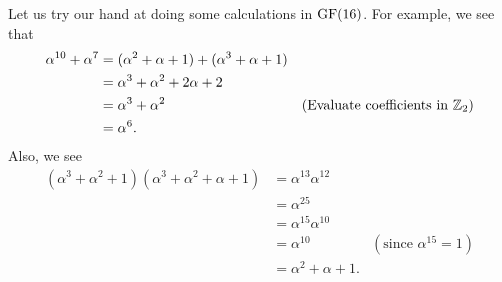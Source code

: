 \begin{example}
    Let us try our hand at doing some calculations in $\mathrm{GF}(16)$. For example, we see that
    \begin{align*}
        \alpha^{10} + \alpha^7 &= (\alpha^2 + \alpha + 1) + (\alpha^3 + \alpha + 1)\\
        &= \alpha^3 + \alpha^2 + 2\alpha + 2\\
        &= \alpha^3 + \alpha^2 & (\text{Evaluate coefficients in }\mathbb{Z}_2)\\
        &= \alpha^6.
    \end{align*}
    Also, we see
    \begin{align*}
        (\alpha^3 + \alpha^2 + 1)(\alpha^3 + \alpha^2 + \alpha + 1) &= \alpha^{13}\alpha^{12}\\
        &= \alpha^{25}\\
        &= \alpha^{15}\alpha^{10}\\
        &= \alpha^{10} & (\text{since }\alpha^{15} = 1)\\
        &= \alpha^2 + \alpha + 1.
    \end{align*}
\end{example}

